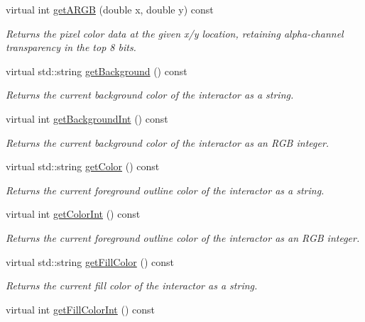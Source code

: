 \begin{DoxyCompactItemize}
virtual int \mbox{\hyperlink{classsgl_1_1GDrawingSurface_ae394d39f20476570e083918d991c25bd}{get\+A\+R\+GB}} (double x, double y) const
\begin{DoxyCompactList}\small\item\em Returns the pixel color data at the given x/y location, retaining alpha-\/channel transparency in the top 8 bits. \end{DoxyCompactList}\item 
virtual std\+::string \mbox{\hyperlink{classsgl_1_1GDrawingSurface_a808e22cc1fdfbecf71ed8c64ef4600e0}{get\+Background}} () const
\begin{DoxyCompactList}\small\item\em Returns the current background color of the interactor as a string. \end{DoxyCompactList}\item 
virtual int \mbox{\hyperlink{classsgl_1_1GDrawingSurface_a9e827257a55cb8cf4d9de2ec6bcfd7a0}{get\+Background\+Int}} () const
\begin{DoxyCompactList}\small\item\em Returns the current background color of the interactor as an R\+GB integer. \end{DoxyCompactList}\item 
virtual std\+::string \mbox{\hyperlink{classsgl_1_1GDrawingSurface_aa061dfa488c31e18549d64363c1d0e34}{get\+Color}} () const
\begin{DoxyCompactList}\small\item\em Returns the current foreground outline color of the interactor as a string. \end{DoxyCompactList}\item 
virtual int \mbox{\hyperlink{classsgl_1_1GDrawingSurface_a9635c7af766cdc3417f346683fa0e6c1}{get\+Color\+Int}} () const
\begin{DoxyCompactList}\small\item\em Returns the current foreground outline color of the interactor as an R\+GB integer. \end{DoxyCompactList}\item 
virtual std\+::string \mbox{\hyperlink{classsgl_1_1GDrawingSurface_a76f6964a11fde7c78e9751be184e1a3c}{get\+Fill\+Color}} () const
\begin{DoxyCompactList}\small\item\em Returns the current fill color of the interactor as a string. \end{DoxyCompactList}\item 
virtual int \mbox{\hyperlink{classsgl_1_1GDrawingSurface_a88f4508d9271c4b5f5b5d6b780f223d0}{get\+Fill\+Color\+Int}} () const

\end{DoxyCompactItemize}
